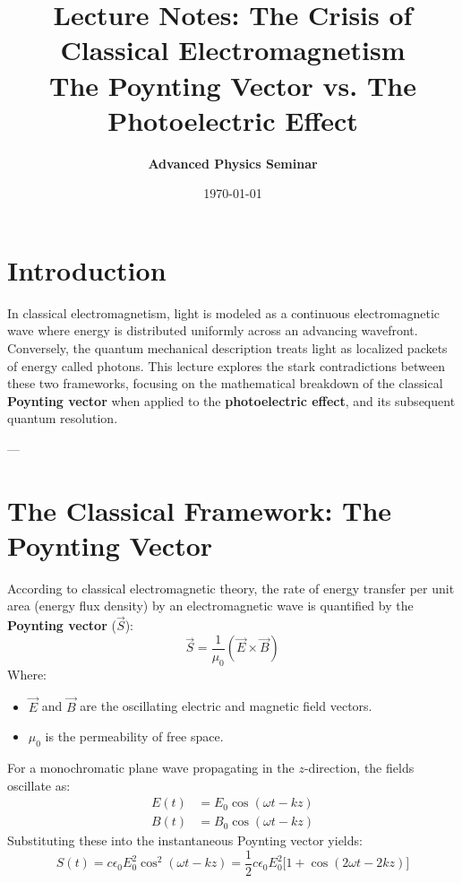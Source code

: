 \documentclass[11pt,a4paper]{article}
\title{\textbf{Lecture Notes: The Crisis of Classical Electromagnetism \\ The Poynting Vector vs. The Photoelectric Effect}}
\author{\textbf{Advanced Physics Seminar}}
\date{\today}
\begin{document}
	
	\maketitle
	
	\section{Introduction}
	In classical electromagnetism, light is modeled as a continuous electromagnetic wave where energy is distributed uniformly across an advancing wavefront. Conversely, the quantum mechanical description treats light as localized packets of energy called photons. This lecture explores the stark contradictions between these two frameworks, focusing on the mathematical breakdown of the classical \textbf{Poynting vector} when applied to the \textbf{photoelectric effect}, and its subsequent quantum resolution.
	
	---
	
	\section{The Classical Framework: The Poynting Vector}
	According to classical electromagnetic theory, the rate of energy transfer per unit area (energy flux density) by an electromagnetic wave is quantified by the \textbf{Poynting vector} ($\vec{S}$):
	\begin{equation}
		\vec{S} = \frac{1}{\mu_0} (\vec{E} \times \vec{B})
	\end{equation}
	Where:
	\begin{itemize}
		\item $\vec{E}$ and $\vec{B}$ are the oscillating electric and magnetic field vectors.
		\item $\mu_0$ is the permeability of free space.
	\end{itemize}
	
	For a monochromatic plane wave propagating in the $z$-direction, the fields oscillate as:
	\begin{align}
		E(t) &= E_0 \cos(\omega t - kz) \\
		B(t) &= B_0 \cos(\omega t - kz)
	\end{align}
	Substituting these into the instantaneous Poynting vector yields:
	\begin{equation}
		S(t) = c \epsilon_0 E_0^2 \cos^2(\omega t - kz) = \frac{1}{2} c \epsilon_0 E_0^2 \Big[ 1 + \cos(2\omega t - 2kz) \Big]
	\end{equation}
	
\end{document}
